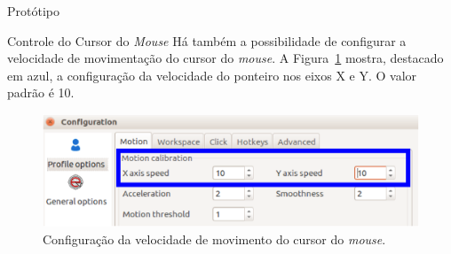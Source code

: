 \begin{chapter}{Protótipo}
\begin{section}{Controle do Cursor do \textit{Mouse}}
Há também a possibilidade de configurar a velocidade de movimentação do cursor
do \textit{mouse}. A Figura~\ref{fig:mouse} mostra, destacado em azul, a
configuração da velocidade do ponteiro nos eixos X e Y. O valor padrão é 10.

\begin{figure}[!h]
	\centering
	\begin{minipage}[c]{\textwidth}
	\centering
	\includegraphics[width=0.7\linewidth]{fig/EviacamConfiguration}
	\caption{Configuração da velocidade de movimento do cursor do \textit{mouse}.}
	\label{fig:mouse}
	\end{minipage}
\end{figure}

\end{section}

\end{chapter}
